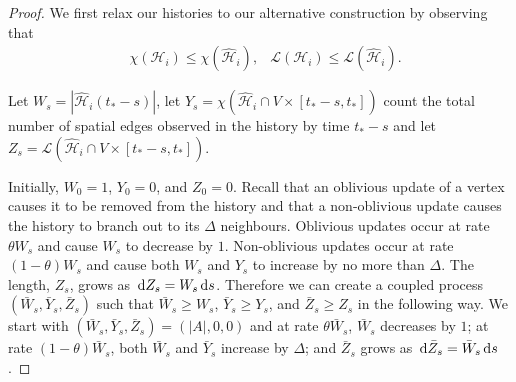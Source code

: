 	\begin{proof}
		We first relax our histories to our alternative construction by observing that
		\begin{align}
			&\chi(\mathcal{H}_i) \leq \chi(\hat{\mathcal{H}}_i), &\mathcal{L}(\mathcal{H}_i) \leq \mathcal{L}(\hat{\mathcal{H}}_i).
		\end{align}


		Let $W_s = |\hat{\mathcal{H}}_i (t_* - s)|$, let $Y_s = \chi(\hat{\mathcal{H}}_i \cap V \times [t_* - s, t_*])$ count the total number of spatial edges observed in the history by time $t_* - s$ and let $Z_s = \mathcal{L}(\hat{\mathcal{H}}_i \cap V \times [t_* - s, t_*])$. 

		Initially, $W_0 = 1$, $Y_0 = 0$, and $Z_0 = 0$. Recall that an oblivious update of a vertex causes it to be removed from the history and that a non-oblivious update causes the history to branch out to its $\Delta$ neighbours. Oblivious updates occur at rate $\theta W_s$ and cause $W_s$ to decrease by $1$. Non-oblivious updates occur at rate $(1 - \theta)W_s$ and cause both $W_s$ and $Y_s$ to increase by no more than $\Delta$. The length, $Z_s$, grows as $\, \mathrm{d} Z_s = W_s \, \mathrm{d} s$. Therefore we can create a coupled process $(\bar{W}_s, \bar{Y}_s, \bar{Z}_s)$ such that $\bar{W}_s \geq W_s$, $\bar{Y}_s \geq Y_s$, and $\bar{Z}_s \geq Z_s$ in the following way. We start with $(\bar{W}_s, \bar{Y}_s, \bar{Z}_s) = (|A|, 0, 0)$ and at rate $\theta \bar{W}_s$, $\bar{W}_s$ decreases by $1$; at rate $(1 - \theta)\bar{W}_s$, both $\bar{W}_s$ and $\bar{Y}_s$ increase by $\Delta$; and $\bar{Z}_s$ grows as $\, \mathrm{d} \bar{Z}_s = \bar{W}_s \, \mathrm{d} s$.


\end{proof}
